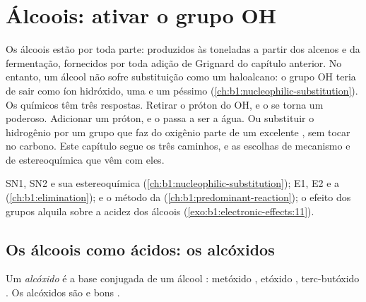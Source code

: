 \chapter{Álcoois: ativar o grupo OH}\label{ch:b1:alcohol-activation}

Os álcoois estão por toda parte: produzidos às toneladas a partir dos
alcenos e da fermentação, fornecidos por toda adição de Grignard do
capítulo anterior. No entanto, um álcool não sofre substituição como um
haloalcano: o grupo OH teria de sair como íon hidróxido, uma  e
um péssimo  (\cref{ch:b1:nucleophilic-substitution}).
Os químicos têm três respostas. Retirar o próton do OH, e o  se
torna um  poderoso. Adicionar um próton, e o 
passa a ser a água. Ou substituir o hidrogênio por um grupo que faz do
oxigênio parte de um excelente , sem tocar no carbono. Este
capítulo segue os três caminhos, e as escolhas de mecanismo e de
estereoquímica que vêm com eles.

\begin{recall}
SN1, SN2 e sua estereoquímica (\cref{ch:b1:nucleophilic-substitution});
E1, E2 e a  (\cref{ch:b1:elimination});  e o método da  (\cref{ch:b1:predominant-reaction});
o efeito dos grupos alquila sobre a acidez dos álcoois
(\cref{exo:b1:electronic-effects:11}).
\end{recall}

\section{Os álcoois como ácidos: os alcóxidos}

\begin{definition}[Alcóxido]\label{def:b1:alcohol-activation:alkoxide}
Um \emph{alcóxido} é a base conjugada  de
um álcool : metóxido , etóxido ,
terc-butóxido . Os alcóxidos são  e bons
.
\end{definition}

